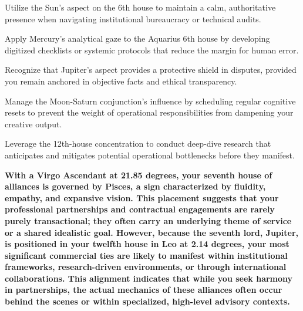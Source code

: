 \begin{diamondlist}
  \item {\fontsize{8.5}{12}\selectfont Utilize the Sun's aspect on the 6th house to maintain a calm, authoritative presence when navigating institutional bureaucracy or technical audits.}
  \item {\fontsize{8.5}{12}\selectfont Apply Mercury's analytical gaze to the Aquarius 6th house by developing digitized checklists or systemic protocols that reduce the margin for human error.}
  \item {\fontsize{8.5}{12}\selectfont Recognize that Jupiter's aspect provides a protective shield in disputes, provided you remain anchored in objective facts and ethical transparency.}
  \item {\fontsize{8.5}{12}\selectfont Manage the Moon-Saturn conjunction's influence by scheduling regular cognitive resets to prevent the weight of operational responsibilities from dampening your creative output.}
  \item {\fontsize{8.5}{12}\selectfont Leverage the 12th-house concentration to conduct deep-dive research that anticipates and mitigates potential operational bottlenecks before they manifest.}
\end{diamondlist}


\label{topic17}

{\fontsize{9.5}{13.8}\selectfont\bfseries\color{DeepSlate} With a Virgo Ascendant at 21.85 degrees, your seventh house of alliances is governed by Pisces, a sign characterized by fluidity, empathy, and expansive vision. This placement suggests that your professional partnerships and contractual engagements are rarely purely transactional; they often carry an underlying theme of service or a shared idealistic goal. However, because the seventh lord, Jupiter, is positioned in your twelfth house in Leo at 2.14 degrees, your most significant commercial ties are likely to manifest within institutional frameworks, research-driven environments, or through international collaborations. This alignment indicates that while you seek harmony in partnerships, the actual mechanics of these alliances often occur behind the scenes or within specialized, high-level advisory contexts.}\par\vspace{2mm}


